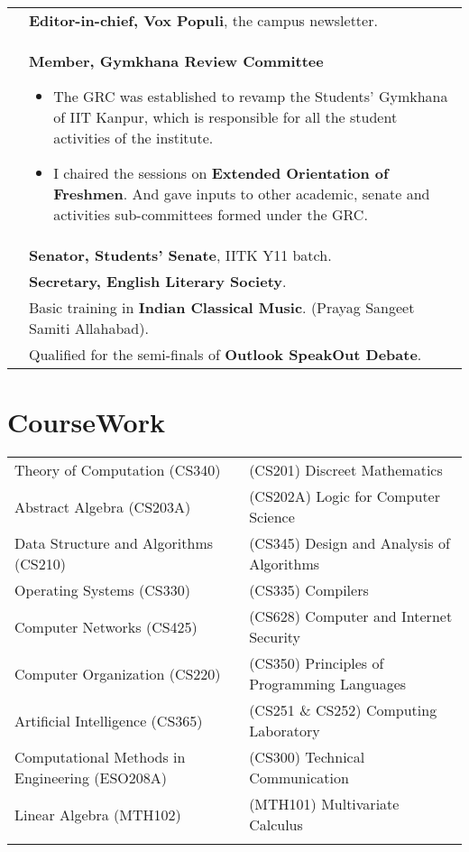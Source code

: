 \documentclass[a4paper,10pt]{article} %
\begin{document}
\begin{tabular}{>{\raggedleft}p{2.2cm}p{15cm}}
    2013 & \textbf{Editor-in-chief, Vox Populi}, the campus newsletter. \\

    2012 & \textbf{Member, Gymkhana Review Committee}
           \footnotesize{
               \begin{itemize}[leftmargin=*]
                   \item The GRC was established to revamp the Students' Gymkhana of IIT Kanpur,
                       which is responsible for all the student activities of the institute.
                   \item I chaired the sessions on \textbf{Extended Orientation of Freshmen}.
                       And gave inputs to other academic, senate and activities sub-committees formed under the GRC.
               \end{itemize}
           }\\

    2012 & \textbf{Senator, Students' Senate}, IITK Y11 batch. \\

    2012 & \textbf{Secretary, English Literary Society}. \\

    2010 & Basic training in \textbf{Indian Classical Music}. (Prayag Sangeet Samiti Allahabad). \\

    2009 & Qualified for the semi-finals of \textbf{Outlook SpeakOut Debate}. \\

\end{tabular}

\section{CourseWork}

\begin{tabular}{>{\raggedleft}p{8cm}|p{8cm}}

    Theory of Computation (CS340) & (CS201) Discreet Mathematics \\
    Abstract Algebra (CS203A) & (CS202A) Logic for Computer Science \\
    Data Structure and Algorithms (CS210) & (CS345) Design and Analysis of Algorithms \\
    Operating Systems (CS330) & (CS335) Compilers \\
    Computer Networks (CS425) &  (CS628) Computer and Internet Security \\
    Computer Organization (CS220) & (CS350) Principles of Programming Languages \\
    Artificial Intelligence (CS365) & (CS251 \& CS252) Computing Laboratory \\
    Computational Methods in Engineering (ESO208A) & (CS300) Technical Communication \\
    Linear Algebra (MTH102) &  (MTH101) Multivariate Calculus \\
                     \\
\end{tabular}
\end{document}
